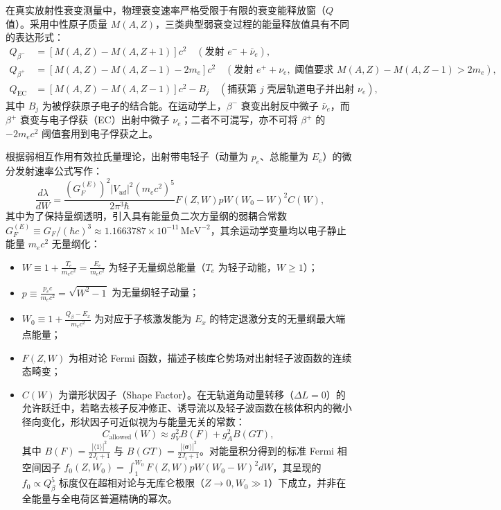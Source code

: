 在真实放射性衰变测量中，物理衰变速率严格受限于有限的衰变能释放窗（$Q$ 值）。采用中性原子质量 $M(A, Z)$，三类典型弱衰变过程的能量释放值具有不同的表达形式：
\begin{align}
Q_{\beta^-} &= [M(A, Z) - M(A, Z+1)] c^2 \quad (\text{发射 } e^- + \bar{\nu}_e), \label{eq:4-7-Q-betaminus}\\
Q_{\beta^+} &= [M(A, Z) - M(A, Z-1) - 2 m_e] c^2 \quad (\text{发射 } e^+ + \nu_e, \text{ 阈值要求 } M(A, Z) - M(A, Z-1) > 2 m_e), \label{eq:4-7-Q-betaplus}\\
Q_{\mathrm{EC}} &= [M(A, Z) - M(A, Z-1)] c^2 - B_j \quad (\text{捕获第 } j \text{ 壳层轨道电子并出射 } \nu_e), \label{eq:4-7-Q-EC}
\end{align}
其中 $B_j$ 为被俘获原子电子的结合能。在运动学上，$\beta^-$ 衰变出射反中微子 $\bar{\nu}_e$，而 $\beta^+$ 衰变与电子俘获（EC）出射中微子 $\nu_e$；二者不可混写，亦不可将 $\beta^+$ 的 $-2m_e c^2$ 阈值套用到电子俘获之上。

根据弱相互作用有效拉氏量理论，出射带电轻子（动量为 $p_e$、总能量为 $E_e$）的微分发射速率公式写作：
\begin{equation}\label{eq:4-7-differential-spectrum}
\frac{d\lambda}{dW} = \frac{(G_F^{(E)})^2 |V_{ud}|^2 (m_e c^2)^5}{2\pi^3 \hbar} F(Z, W) p W (W_0 - W)^2 C(W),
\end{equation}
其中为了保持量纲透明，引入具有能量负二次方量纲的弱耦合常数 $G_F^{(E)} \equiv G_F / (\hbar c)^3 \approx 1.1663787 \times 10^{-11}\,\mathrm{MeV}^{-2}$，其余运动学变量均以电子静止能量 $m_e c^2$ 无量纲化：
\begin{itemize}
\item $W \equiv 1 + \frac{T_e}{m_e c^2} = \frac{E_e}{m_e c^2}$ 为轻子无量纲总能量（$T_e$ 为轻子动能，$W \ge 1$）；
\item $p \equiv \frac{p_e c}{m_e c^2} = \sqrt{W^2 - 1}$ 为无量纲轻子动量；
\item $W_0 \equiv 1 + \frac{Q_\beta - E_x}{m_e c^2}$ 为对应于子核激发能为 $E_x$ 的特定退激分支的无量纲最大端点能量；
\item $F(Z, W)$ 为相对论 Fermi 函数，描述子核库仑势场对出射轻子波函数的连续态畸变；
\item $C(W)$ 为谱形状因子（Shape Factor）。在无轨道角动量转移（$\Delta L = 0$）的允许跃迁中，若略去核子反冲修正、诱导流以及轻子波函数在核体积内的微小径向变化，形状因子可近似视为与能量无关的常数：
\begin{equation}\label{eq:4-7-shape-factor-allowed}
C_{\mathrm{allowed}}(W) \approx g_V^2 B(F) + g_A^2 B(GT),
\end{equation}
其中 $B(F) = \frac{|\langle 1 \rangle|^2}{2J_i + 1}$ 与 $B(GT) = \frac{|\langle \boldsymbol{\sigma} \rangle|^2}{2J_i + 1}$。对能量积分得到的标准 Fermi 相空间因子 $f_0(Z, W_0) = \int_1^{W_0} F(Z, W) p W (W_0 - W)^2 dW$，其呈现的 $f_0 \propto Q_\beta^5$ 标度仅在超相对论与无库仑极限（$Z \to 0, W_0 \gg 1$）下成立，并非在全能量与全电荷区普遍精确的幂次。
\end{itemize}

